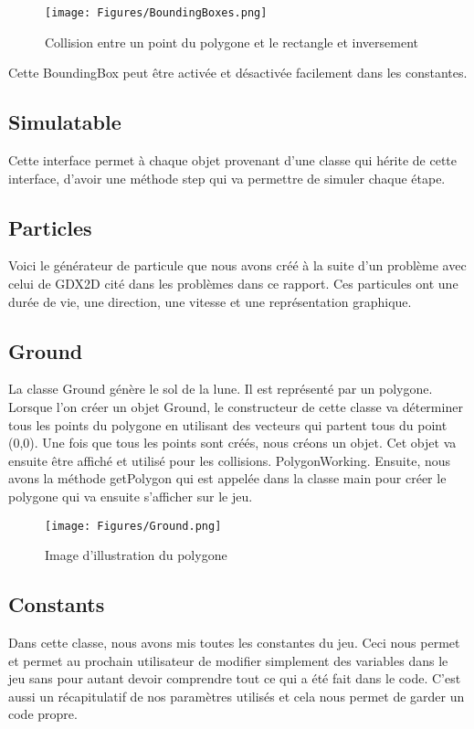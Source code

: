 \begin{figure}[h]
 \centering
 \texttt{[image: Figures/BoundingBoxes.png]}
 \caption{Collision entre un point du polygone et le rectangle et inversement}
 \label{figure:BoundingBoxes}
\end{figure}

Cette BoundingBox peut être activée et désactivée facilement dans les constantes.

\subsection{Simulatable}
Cette interface permet à chaque objet provenant d’une classe qui hérite de cette interface, d’avoir une méthode step qui va permettre de simuler chaque étape.

\subsection{Particles}
Voici le générateur de particule que nous avons créé à la suite d’un problème avec celui de GDX2D cité dans les problèmes dans ce rapport. Ces particules ont une durée de vie, une direction, une vitesse et une représentation graphique.

\subsection{Ground}
La classe Ground génère le sol de la lune. Il est représenté par un polygone. Lorsque l’on créer un objet Ground, le constructeur de cette classe va déterminer tous les points du polygone en utilisant des vecteurs qui partent tous du point (0,0). Une fois que tous les points sont créés, nous créons un objet. Cet objet va ensuite être affiché et utilisé pour les collisions.  PolygonWorking. Ensuite, nous avons la méthode getPolygon qui est appelée dans la classe main pour créer le polygone qui va ensuite s’afficher sur le jeu.
\begin{figure}[h]
 \centering
 \texttt{[image: Figures/Ground.png]}
 \caption{Image d'illustration du polygone}
 \label{figure:Ground}
\end{figure}

\subsection{Constants}
Dans cette classe, nous avons mis toutes les constantes du jeu. Ceci nous permet et permet au prochain utilisateur de modifier simplement des variables dans le jeu sans pour autant devoir comprendre tout ce qui a été fait dans le code. C’est aussi un récapitulatif de nos paramètres utilisés et cela nous permet de garder un code propre.

